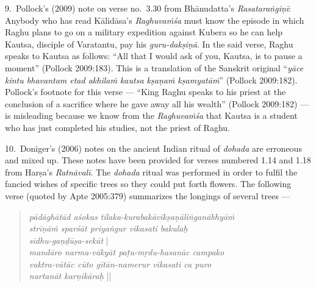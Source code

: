 9.~Pollock’s (2009) note on verse no.~3.30 from Bhānudatta’s \textsl{Rasataraṅgiṇī}: Anybody who has read Kālidāsa’s \textsl{Raghuvaṁśa} must know the episode in which Raghu plans to go on a military expedition against Kubera so he can help Kautsa, disciple of Varatantu, pay his \textsl{guru-dakṣiṇā}. In the said verse, Raghu speaks to Kautsa as follows: “All that I would ask of you, Kautsa, is to pause a moment” (Pollock 2009:183). This is a translation of the Sanskrit original “\textsl{yāce kintu bhavantam etad akhilaṁ kautsa kṣaṇaṁ kṣamyatāṁ}” (Pollock 2009:182). Pollock’s footnote for this verse --- “King Raghu speaks to his priest at the conclusion of a sacrifice where he gave away all his wealth” (Pollock 2009:182) --- is misleading because we know from the \textsl{Raghuvaṁśa} that Kautsa is a student who has just completed his studies, not the priest of Raghu.

10.~Doniger’s (2006) notes on the ancient Indian ritual of \textsl{dohada} are erroneous and mixed up. These notes have been provided for verses numbered 1.14 and 1.18 from Harṣa’s \textsl{Ratnāvalī}. The \textsl{dohada} ritual was performed in order to fulfil the fancied wishes of specific trees so they could put forth flowers. The following verse (quoted by Apte 2005:379) summarizes the longings of several trees ---
\begin{quote}
\textsl{pādāghātād aśokas tilaka-kurabakāvīkṣaṇāliṅganābhyāṁ}\\
\textsl{strīṇāṁ sparśāt priyaṅgur vikasati bakulaḥ}\\
\textsl{sīdhu-gaṇḍūṣa-sekāt} |\\
\textsl{mandāro narma-vākyāt paṭu-mṛdu-hasanāc campako}\\
\textsl{vaktra-vātāc cūto gītān-namerur vikasati ca puro}\\
\textsl{nartanāt karṇikāraḥ} ||
\end{quote}

